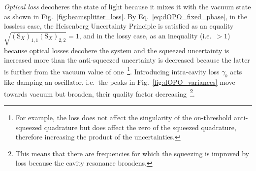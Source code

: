 \emph{Optical loss} decoheres the state of light because it mixes it with the vacuum state as shown in Fig.~\ref{fig:beamsplitter_loss}.
By Eq.~\ref{eq:dOPO_fixed_phase}, in the lossless case, the Heisenberg Uncertainty Principle is satisfied as an equality $\sqrt{(\text{S}_X)_{1,1}(\text{S}_X)_{2,2}}=1$, and in the lossy case, as an inequality (i.e.\ $>1$) because optical losses decohere the system and the squeezed uncertainty is increased more than the anti-squeezed uncertainty is decreased because the latter is further from the vacuum value of one~\footnote{For example, the loss does not affect the singularity of the on-threshold anti-squeezed quadrature but does affect the zero of the squeezed quadrature, therefore increasing the product of the uncertainties.}.
Introducing intra-cavity loss $\gamma_b$ acts like damping an oscillator, i.e.\ the peaks in Fig.~\ref{fig:dOPO_variances} move towards vacuum but broaden, their quality factor decreasing~\footnote{This means that there are frequencies for which the squeezing is improved by loss because the cavity resonance broadens.}.
